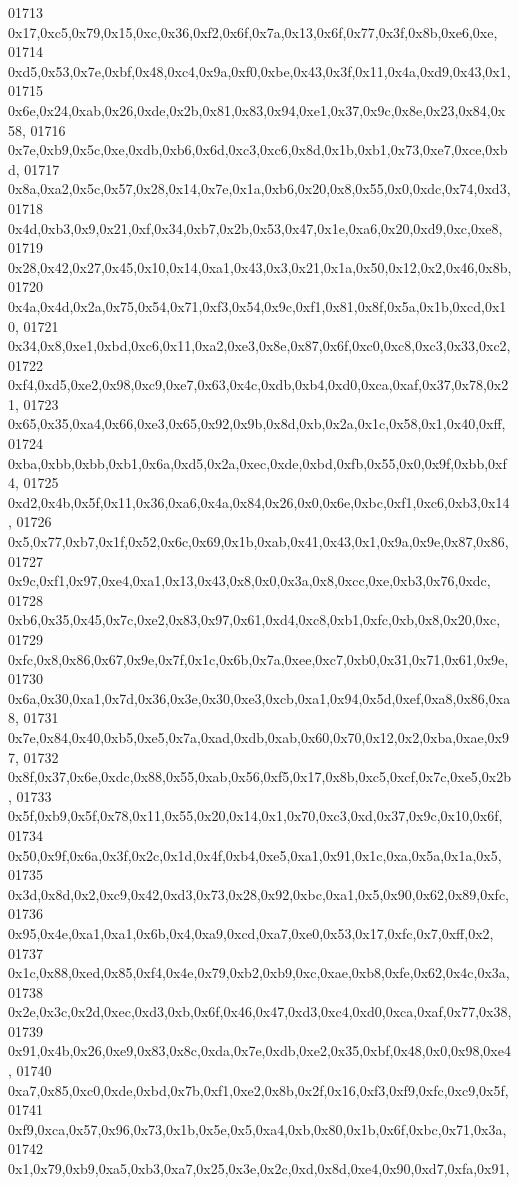 \begin{DoxyCode}
01713   0x17,0xc5,0x79,0x15,0xc,0x36,0xf2,0x6f,0x7a,0x13,0x6f,0x77,0x3f,0x8b,0xe6,0xe,
01714   0xd5,0x53,0x7e,0xbf,0x48,0xc4,0x9a,0xf0,0xbe,0x43,0x3f,0x11,0x4a,0xd9,0x43,0x1,
01715   0x6e,0x24,0xab,0x26,0xde,0x2b,0x81,0x83,0x94,0xe1,0x37,0x9c,0x8e,0x23,0x84,0x58,
01716   0x7e,0xb9,0x5c,0xe,0xdb,0xb6,0x6d,0xc3,0xc6,0x8d,0x1b,0xb1,0x73,0xe7,0xce,0xbd,
01717   0x8a,0xa2,0x5c,0x57,0x28,0x14,0x7e,0x1a,0xb6,0x20,0x8,0x55,0x0,0xdc,0x74,0xd3,
01718   0x4d,0xb3,0x9,0x21,0xf,0x34,0xb7,0x2b,0x53,0x47,0x1e,0xa6,0x20,0xd9,0xc,0xe8,
01719   0x28,0x42,0x27,0x45,0x10,0x14,0xa1,0x43,0x3,0x21,0x1a,0x50,0x12,0x2,0x46,0x8b,
01720   0x4a,0x4d,0x2a,0x75,0x54,0x71,0xf3,0x54,0x9c,0xf1,0x81,0x8f,0x5a,0x1b,0xcd,0x10,
01721   0x34,0x8,0xe1,0xbd,0xc6,0x11,0xa2,0xe3,0x8e,0x87,0x6f,0xc0,0xc8,0xc3,0x33,0xc2,
01722   0xf4,0xd5,0xe2,0x98,0xc9,0xe7,0x63,0x4c,0xdb,0xb4,0xd0,0xca,0xaf,0x37,0x78,0x21,
01723   0x65,0x35,0xa4,0x66,0xe3,0x65,0x92,0x9b,0x8d,0xb,0x2a,0x1c,0x58,0x1,0x40,0xff,
01724   0xba,0xbb,0xbb,0xb1,0x6a,0xd5,0x2a,0xec,0xde,0xbd,0xfb,0x55,0x0,0x9f,0xbb,0xf4,
01725   0xd2,0x4b,0x5f,0x11,0x36,0xa6,0x4a,0x84,0x26,0x0,0x6e,0xbc,0xf1,0xc6,0xb3,0x14,
01726   0x5,0x77,0xb7,0x1f,0x52,0x6c,0x69,0x1b,0xab,0x41,0x43,0x1,0x9a,0x9e,0x87,0x86,
01727   0x9c,0xf1,0x97,0xe4,0xa1,0x13,0x43,0x8,0x0,0x3a,0x8,0xcc,0xe,0xb3,0x76,0xdc,
01728   0xb6,0x35,0x45,0x7c,0xe2,0x83,0x97,0x61,0xd4,0xc8,0xb1,0xfc,0xb,0x8,0x20,0xc,
01729   0xfc,0x8,0x86,0x67,0x9e,0x7f,0x1c,0x6b,0x7a,0xee,0xc7,0xb0,0x31,0x71,0x61,0x9e,
01730   0x6a,0x30,0xa1,0x7d,0x36,0x3e,0x30,0xe3,0xcb,0xa1,0x94,0x5d,0xef,0xa8,0x86,0xa8,
01731   0x7e,0x84,0x40,0xb5,0xe5,0x7a,0xad,0xdb,0xab,0x60,0x70,0x12,0x2,0xba,0xae,0x97,
01732   0x8f,0x37,0x6e,0xdc,0x88,0x55,0xab,0x56,0xf5,0x17,0x8b,0xc5,0xcf,0x7c,0xe5,0x2b,
01733   0x5f,0xb9,0x5f,0x78,0x11,0x55,0x20,0x14,0x1,0x70,0xc3,0xd,0x37,0x9c,0x10,0x6f,
01734   0x50,0x9f,0x6a,0x3f,0x2c,0x1d,0x4f,0xb4,0xe5,0xa1,0x91,0x1c,0xa,0x5a,0x1a,0x5,
01735   0x3d,0x8d,0x2,0xc9,0x42,0xd3,0x73,0x28,0x92,0xbc,0xa1,0x5,0x90,0x62,0x89,0xfc,
01736   0x95,0x4e,0xa1,0xa1,0x6b,0x4,0xa9,0xcd,0xa7,0xe0,0x53,0x17,0xfc,0x7,0xff,0x2,
01737   0x1c,0x88,0xed,0x85,0xf4,0x4e,0x79,0xb2,0xb9,0xc,0xae,0xb8,0xfe,0x62,0x4c,0x3a,
01738   0x2e,0x3c,0x2d,0xec,0xd3,0xb,0x6f,0x46,0x47,0xd3,0xc4,0xd0,0xca,0xaf,0x77,0x38,
01739   0x91,0x4b,0x26,0xe9,0x83,0x8c,0xda,0x7e,0xdb,0xe2,0x35,0xbf,0x48,0x0,0x98,0xe4,
01740   0xa7,0x85,0xc0,0xde,0xbd,0x7b,0xf1,0xe2,0x8b,0x2f,0x16,0xf3,0xf9,0xfc,0xc9,0x5f,
01741   0xf9,0xca,0x57,0x96,0x73,0x1b,0x5e,0x5,0xa4,0xb,0x80,0x1b,0x6f,0xbc,0x71,0x3a,
01742   0x1,0x79,0xb9,0xa5,0xb3,0xa7,0x25,0x3e,0x2c,0xd,0x8d,0xe4,0x90,0xd7,0xfa,0x91,

\end{DoxyCode}
